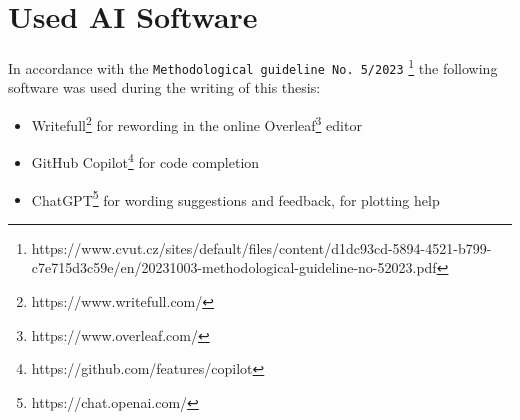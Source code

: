 \renewcommand{\thechapter}{B}
\renewcommand\chaptername{Appendix B}

\chapter{Used AI Software}

\noindent In accordance with the \texttt{Methodological guideline No. 5/2023}
\footnote{https://www.cvut.cz/sites/default/files/content/d1dc93cd-5894-4521-b799-c7e715d3c59e/en/20231003-methodological-guideline-no-52023.pdf}
the following software was used during the writing of this thesis:
\begin{itemize}
    \item {Writefull\footnote{https://www.writefull.com/} for rewording in the online Overleaf\footnote{https://www.overleaf.com/} editor}
    \item {GitHub Copilot\footnote{https://github.com/features/copilot} for code completion}
    \item {ChatGPT\footnote{https://chat.openai.com/} for wording suggestions and feedback, for plotting help}
\end{itemize}